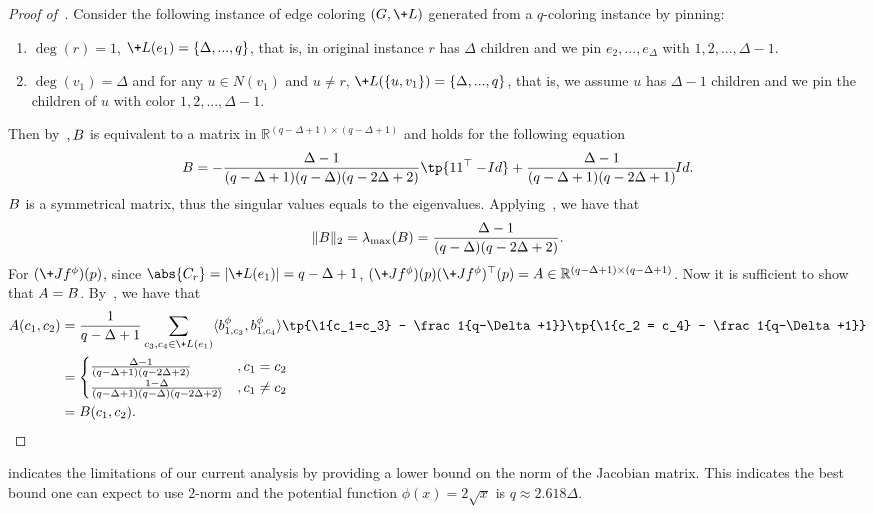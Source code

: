 \begin{proof}[Proof of~]
    Consider the following instance of edge coloring $(G,\+L)$ generated from a $q$-coloring instance by pinning:
    \begin{enumerate}
        \item $\deg(r) = 1$, $\+L(e_1) = \{\Delta,...,q\}$, that is, in original instance $r$ has $\Delta$ children and we pin $e_2,...,e_{\Delta}$ with $1,2,...,\Delta-1$.
        \item $\deg(v_1) = \Delta$ and for any $u\in N(v_1)$ and $u\neq r$, $\+L(\{u,v_1\}) = \{\Delta,...,q\}$, that is, we assume $u$ has $\Delta-1$ children and we pin the children of $u$ with color $1,2,...,\Delta-1$.
    \end{enumerate}
    Then by~$, \*B$ is equivalent to a matrix in $\mathbb{R}^{(q-\Delta+1)\times (q-\Delta+1)}$ and holds for the following equation
    $$
        \*B = -\frac{\Delta-1}{(q-\Delta+1)(q-\Delta)(q-2\Delta+2)}\tp{\*1\*1^\top - \!{Id}} + \frac{\Delta-1}{(q-\Delta+1)(q-2\Delta+1)}\!{Id}.
    $$
    $\*B$ is a symmetrical matrix, thus the singular values equals to the eigenvalues. 
    Applying~, we have that
    $$
        \|\*B\|_2 = \lambda_{\max}(\*B) = \frac{\Delta-1}{(q-\Delta)(q-2\Delta+2)}.
    $$
    For $(\+J f^\phi)(\*p)$, since $\abs{C_r} = |\+L(e_1)| = q-\Delta+1$, $(\+J f^\phi)(\*p)(\+J f^\phi)^\top(\*p) = \*A \in \mathbb{R}^{(q-\Delta+1)\times (q-\Delta+1)}$.
    Now it is sufficient to show that $\*A = \*B$.
    By~, we have that
    \begin{align*}
        \*A(c_1,c_2) &= \frac 1{q-\Delta+1}\sum_{c_3,c_4\in \+L(e_1)}\langle \*b^\phi_{1,c_3}, \*b^\phi_{1,c_4}\rangle\tp{\1{c_1=c_3} - \frac 1{q-\Delta+1}}\tp{\1{c_2 = c_4} - \frac 1{q-\Delta+1}}
        \\&= \begin{cases}
            \frac{\Delta-1}{(q-\Delta+1)(q-2\Delta+2)} &, c_1 = c_2
            \\\frac{1-\Delta}{(q-\Delta+1)(q-\Delta)(q-2\Delta+2)} &, c_1\neq c_2
        \end{cases}
        \\&= \*B(c_1,c_2).
    \end{align*}
\end{proof}
 indicates the limitations of our current analysis by providing a lower bound on the norm of the Jacobian matrix. This indicates the best bound one can expect to use $2$-norm and the potential function $\phi(x) = 2\sqrt{x}$ is $q\approx 2.618\Delta$.



